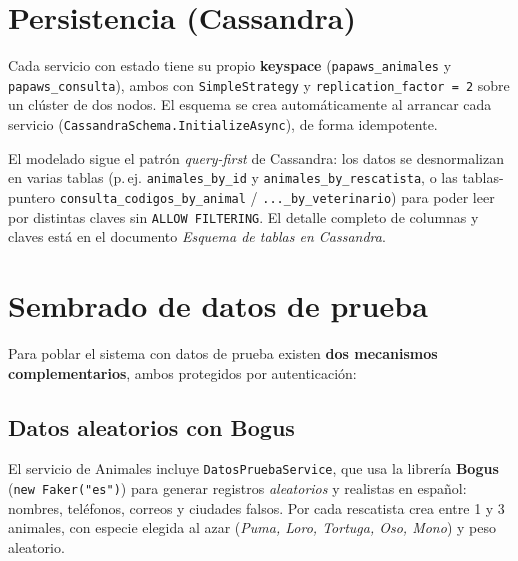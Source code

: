 \documentclass[11pt,a4paper]{article}
\begin{document}
\section{Persistencia (Cassandra)}

Cada servicio con estado tiene su propio \textbf{keyspace}
(\texttt{papaws\_animales} y \texttt{papaws\_consulta}), ambos con
\texttt{SimpleStrategy} y \texttt{replication\_factor = 2} sobre un clúster de dos
nodos. El esquema se crea automáticamente al arrancar cada servicio
(\texttt{CassandraSchema.InitializeAsync}), de forma idempotente.

El modelado sigue el patrón \emph{query-first} de Cassandra: los datos se
desnormalizan en varias tablas (p.\,ej. \texttt{animales\_by\_id} y
\texttt{animales\_by\_rescatista}, o las tablas-puntero
\texttt{consulta\_codigos\_by\_animal} / \texttt{...\_by\_veterinario}) para poder
leer por distintas claves sin \texttt{ALLOW FILTERING}. El detalle completo de
columnas y claves está en el documento \emph{Esquema de tablas en Cassandra}.

\section{Sembrado de datos de prueba}

Para poblar el sistema con datos de prueba existen \textbf{dos mecanismos
complementarios}, ambos protegidos por autenticación:

\subsection{Datos aleatorios con Bogus}
El servicio de Animales incluye \texttt{DatosPruebaService}, que usa la librería
\textbf{Bogus} (\texttt{new Faker("es")}) para generar registros \emph{aleatorios}
y realistas en español: nombres, teléfonos, correos y ciudades falsos. Por cada
rescatista crea entre 1 y 3 animales, con especie elegida al azar
(\emph{Puma, Loro, Tortuga, Oso, Mono}) y peso aleatorio.
\end{document}
